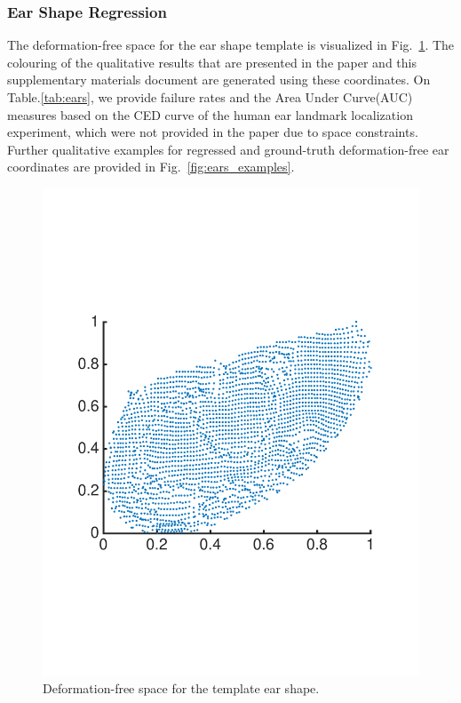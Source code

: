 \subsubsection{Ear Shape Regression}

The deformation-free space for the ear shape template is visualized in Fig.~\ref{fig:earpoints}. The colouring of the qualitative results that are presented in the paper and this supplementary materials document are generated using these coordinates. On Table.\ref{tab:ears}, we provide failure rates and the Area Under Curve(AUC) measures based on the CED curve of the human ear landmark localization experiment, which were not provided in the paper due to space constraints. Further qualitative examples for regressed and ground-truth deformation-free ear coordinates are provided in Fig.~\ref{fig:ears_examples}.


\begin{figure}[ht]
\centering
  \includegraphics[trim={3.1cm 8cm 0.35cm 7.3cm},width=0.7\linewidth]{resources/Human_Poses/EarPoints}
\caption{ Deformation-free space for the template ear shape. }
\label{fig:earpoints}
\end{figure}


